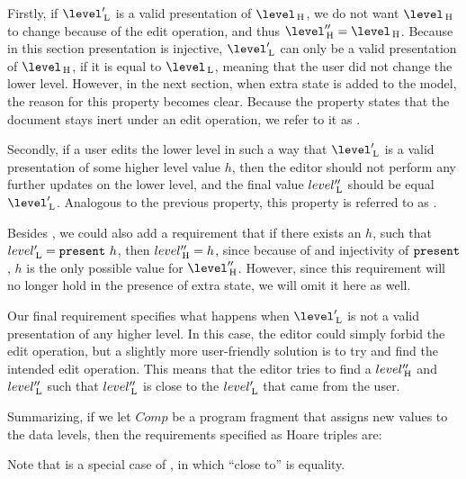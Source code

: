 Firstly, if $\level'\L$ is a valid presentation of $\level\H$, we do not want $\level\H$ to change because of the edit operation, and thus $\level''\H = \level\H$. Because in this section presentation is injective, $\level'\L$ can only be a valid presentation of $\level\H$, if it is equal to $\level\L$, meaning that the user did not change the lower level. However, in the next section, when extra state is added to the model, the reason for this property becomes clear. Because the property states that the document stays inert under an edit operation, we refer to it as .

Secondly, if a user edits the lower level in such a way that $\level'\L$ is a valid presentation of some higher level value $h$, then the editor should not perform any further updates on the lower level, and the final value $level''_{\, \mathrm L}$ should be equal $\level'\L$. Analogous to the previous property, this property is referred to as .

Besides , we could also add a requirement that if there exists an $h$, such that $level'_{\, \mathrm L} = {\tt present}~h$, then $level''_{\, \mathrm H} = h$, since because of  and injectivity of ${\tt present}$, $h$ is the only possible value for $\level''\H$. However, since this requirement will no longer hold in the presence of extra state, we will omit it here as well.

Our final requirement specifies what happens when $\level'\L$ is not a valid presentation of any higher level. In this case, the editor could simply forbid the edit operation, but a slightly more user-friendly solution is to try and find the intended edit operation. This means that the editor tries to find a $level''_{\, \mathrm H}$ and $level''_{\, \mathrm L}$ such that $level''_{\, \mathrm L}$ is close to the $level'_{\, \mathrm L}$ that came from the user. 

Summarizing, if we let $Comp$ be a program fragment that assigns new values to the data levels, then the requirements specified as Hoare triples are:


Note that  is a special case of , in which ``close to'' is equality.

